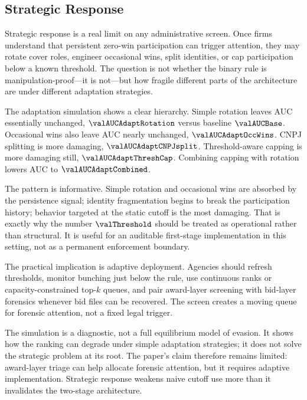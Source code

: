 \subsection{Strategic Response}
\label{sec:strategic_response_v18}

Strategic response is a real limit on any administrative
screen. Once firms understand that persistent zero-win
participation can trigger attention, they may rotate cover
roles, engineer occasional wins, split identities, or cap
participation below a known threshold. The question is not
whether the binary rule is manipulation-proof---it is
not---but how fragile different parts of the architecture are
under different adaptation strategies.

The adaptation simulation shows a clear hierarchy. Simple
rotation leaves AUC essentially unchanged,
$\valAUCAdaptRotation$ versus baseline $\valAUCBase$.
Occasional wins also leave AUC nearly unchanged,
$\valAUCAdaptOccWins$. CNPJ splitting is more damaging,
$\valAUCAdaptCNPJsplit$. Threshold-aware capping is more
damaging still, $\valAUCAdaptThreshCap$. Combining capping with
rotation lowers AUC to $\valAUCAdaptCombined$.

The pattern is informative. Simple rotation and occasional wins
are absorbed by the persistence signal; identity fragmentation
begins to break the participation history; behavior targeted at
the static cutoff is the most damaging. That is exactly why the
number $\valThreshold$ should be treated as operational rather
than structural. It is useful for an auditable first-stage
implementation in this setting, not as a permanent enforcement
boundary.

The practical implication is adaptive deployment. Agencies
should refresh thresholds, monitor bunching just below the
rule, use continuous ranks or capacity-constrained top-$k$
queues, and pair award-layer screening with bid-layer
forensics whenever bid files can be recovered. The screen
creates a moving queue for forensic attention, not a fixed
legal trigger.

The simulation is a diagnostic, not a full equilibrium model of
evasion. It shows how the ranking can degrade under simple
adaptation strategies; it does not solve the strategic problem
at its root. The paper's claim therefore remains limited:
award-layer triage can help allocate forensic attention, but it
requires adaptive implementation. Strategic response weakens
naive cutoff use more than it invalidates the two-stage
architecture.


